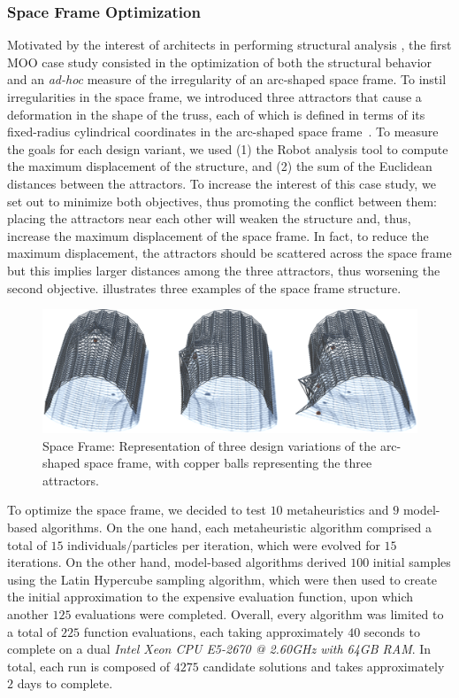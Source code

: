 \subsubsection{Space Frame Optimization}
Motivated by the interest of architects in performing structural analysis \cite{Cichocka2017SURVEY}, the first \ac{MOO} case study consisted in the optimization of both the structural behavior and an \textit{ad-hoc} measure of the irregularity of an arc-shaped space frame. To instil irregularities in the space frame, we introduced three attractors that cause a deformation in the shape of the truss, each of which is defined in terms of its fixed-radius cylindrical coordinates in the arc-shaped space frame~\cite{Belem2019MOO}. To measure the goals for each design variant, we used (1) the Robot analysis tool to compute the maximum displacement of the structure, and (2) the sum of the Euclidean distances between the attractors. To increase the interest of this case study, we set out to minimize both objectives, thus promoting the conflict between them: placing the attractors near each other will weaken the structure and, thus, increase the maximum displacement of the space frame. In fact, to reduce the maximum displacement, the attractors should be scattered across the space frame but this implies larger distances among the three attractors, thus worsening the second objective.  illustrates three examples of the space frame structure. 

\begin{figure}[htbp]
	\centering
	\includegraphics[width=1\textwidth]{Images/Evaluation/truss-kat-small.png}
	\caption[Space Frame: Representation of three space frame design variants]{Space Frame: Representation of three design variations of the arc-shaped space frame, with copper balls representing the three attractors.}
	\label{fig:spaceframe}
\end{figure}

To optimize the space frame, we decided to test $10$ metaheuristics and $9$ model-based algorithms. On the one hand, each metaheuristic algorithm comprised a total of $15$ individuals/particles per iteration, which were evolved for $15$ iterations. On the other hand, model-based algorithms derived $100$ initial samples using the Latin Hypercube sampling algorithm, which were then used to create the initial approximation to the expensive evaluation function, upon which another $125$ evaluations were completed. Overall, every algorithm was limited to a total of $225$ function evaluations, each taking approximately $40$ seconds to complete on a dual \textit{Intel Xeon CPU E5-2670 @ 2.60GHz with 64GB RAM}. In total, each run is composed of $4275$ candidate solutions and takes approximately $2$ days to complete.

